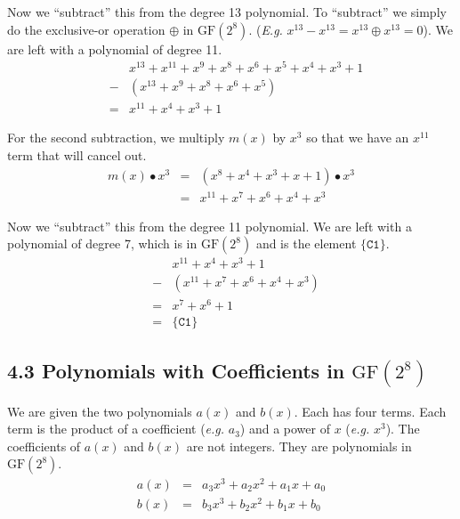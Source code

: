 \documentclass{article}
\newcommand{\GF}{\mathrm{GF}(2^8)}
\newcommand{\gfadd}{\oplus}
\newcommand{\gfmul}{\bullet}
\begin{document}
Now we ``subtract'' this from the degree 13 polynomial.
To ``subtract'' we simply do the exclusive-or operation $\gfadd$ in $\GF$.
(\emph{E.g.} $x^{13} - x^{13} = x^{13} \gfadd x^{13} = 0$).
We are left with a polynomial of degree 11.
\begin{eqnarray*}
  & & x^{13} + x^{11} + x^9 + x^8 + x^6 + x^5 + x^4 + x^3 + 1 \\
  &-& (x^{13} + x^9 + x^8 + x^6 + x^5) \\
  &=& x^{11} + x^4 + x^3 + 1
\end{eqnarray*}

For the second subtraction, we multiply $m(x)$ by $x^3$
so that we have an $x^{11}$ term that will cancel out.
\begin{eqnarray*}
  m(x) \gfmul x^3 &=& (x^8 + x^4 + x^3 + x + 1) \gfmul x^3 \\
  &=& x^{11} + x^7 + x^6 + x^4 + x^3
\end{eqnarray*}

Now we ``subtract'' this from the degree 11 polynomial.
We are left with a polynomial of degree 7, 
which is in $\GF$ and is the element $\{\mathtt{C1}\}$.
\begin{eqnarray*}
  & & x^{11} + x^4 + x^3 + 1 \\
  &-& (x^{11} + x^7 + x^6 + x^4 + x^3) \\
  &=& x^7 + x^6 + 1 \\
  &=& \{\mathtt{C1}\}
\end{eqnarray*}


\subsection*{4.3 Polynomials with Coefficients in $\GF$}

We are given the two polynomials $a(x)$ and $b(x)$. Each has four terms.
Each term is the product of a coefficient (\emph{e.g.} $a_3$) 
and a power of $x$ (\emph{e.g.} $x^3$).
The coefficients of $a(x)$ and $b(x)$ are not integers. They are polynomials in $\GF$.
\begin{eqnarray*}
  a(x) &=& a_3 x^3 + a_2 x^2 + a_1 x + a_0 \\
  b(x) &=& b_3 x^3 + b_2 x^2 + b_1 x + b_0
\end{eqnarray*}
\end{document}
